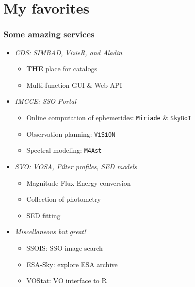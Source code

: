 \section{My favorites}


\begin{frame}
  \frametitle{Some amazing services}

  \begin{itemize}
    \item \emph{CDS: SIMBAD, VizieR, and Aladin}
      \begin{itemize}[<.->]
        \item \textbf{THE} place for catalogs
        \item Multi-function GUI \& Web API
      \end{itemize}

    \vspace{0.5em}
    \item \emph{IMCCE: SSO Portal}
      \begin{itemize}[<.->]
        \item Online computation of ephemerides: \texttt{Miriade} \& \texttt{SkyBoT}
        \item Observation planning: \texttt{ViSiON}
        \item Spectral modeling: \texttt{M4Ast}
      \end{itemize}

    \vspace{0.5em}
    \item \emph{SVO: VOSA, Filter profiles, SED models}
      \begin{itemize}[<.->]
        \item Magnitude-Flux-Energy conversion
        \item Collection of photometry 
        \item SED fitting
      \end{itemize}

    \vspace{0.5em}
    \item \emph{Miscellaneous but great!}
      \begin{itemize}[<.->]
        \item SSOIS: SSO image search
        \item ESA-Sky: explore ESA archive
        \item VOStat: VO interface to R
      \end{itemize}
  \end{itemize}

\end{frame}
